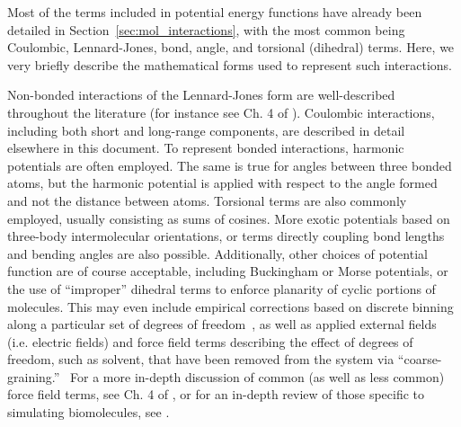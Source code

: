 \documentclass[9pt,bestpractices]{livecoms}
\begin{document}
Most of the terms included in potential energy functions have already been detailed in Section~\ref{sec:mol_interactions}, with the most common being Coulombic, Lennard-Jones, bond, angle, and torsional (dihedral) terms. 
Here, we very briefly describe the mathematical forms used to represent such interactions.

Non-bonded interactions of the Lennard-Jones form are well-described throughout the literature (for instance see Ch. 4 of \citet{LeachBook}). 
Coulombic interactions, including both short and long-range components, are described in detail elsewhere in this document.
To represent bonded interactions, harmonic potentials are often employed. 
The same is true for angles between three bonded atoms, but the harmonic potential  is applied with respect to the angle formed and not the distance between atoms. 
Torsional terms are also commonly employed, usually consisting as sums of  cosines.
More exotic potentials based on three-body intermolecular  orientations, or terms directly coupling bond lengths and bending angles are also possible. 
Additionally, other choices of potential function are of course  acceptable, including Buckingham or Morse potentials, or the use of ``improper'' dihedral terms to enforce planarity of cyclic portions of molecules. 
This may even include empirical corrections based on discrete binning along a particular set of degrees of freedom~\citep{mackerell2004CMAP, perez2015}, as well as applied external fields (i.e. electric fields) and force field terms describing the effect of degrees of freedom, such as solvent, that have been removed from the system via ``coarse-graining.''~\citep{sanyal2016}
For a more in-depth discussion of common (as well as less common) force field terms, see Ch. 4 of \citet{LeachBook}, or for an in-depth review of those specific to simulating biomolecules, see \citet{Ponder2003}.
\end{document}
